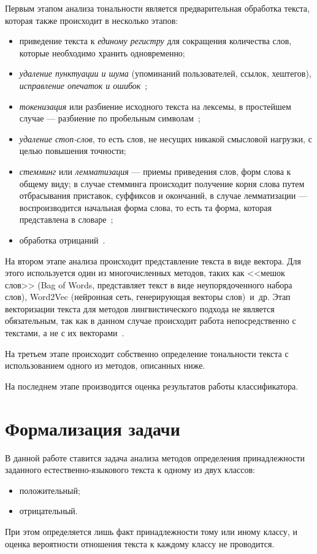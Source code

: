 Первым этапом анализа тональности является предварительная обработка текста,
которая также происходит в несколько этапов:
\begin{itemize}
    \item приведение текста к \textit{единому регистру} для сокращения
        количества слов, которые необходимо хранить одновременно;
    \item \textit{удаление пунктуации и шума} (упоминаний пользователей, ссылок,
        хештегов), \textit{исправление опечаток и ошибок}~\cite{article06};
    \item \textit{токенизация} или разбиение исходного текста на лексемы, в простейшем
        случае --- разбиение по пробельным символам~\cite{article07};
    \item \textit{удаление стоп-слов}, то есть слов, не несущих никакой смысловой
        нагрузки, с целью повышения точности;
    \item \textit{стемминг} или \textit{лемматизация} --- приемы приведения
        слов, форм слова к общему виду; в случае стемминга происходит получение
        корня слова путем отбрасывания приставок, суффиксов и окончаний, в
        случае лемматизации --- воспроизводится начальная форма слова, то есть
        та форма, которая представлена в словаре~\cite{article06};
    \item обработка отрицаний~\cite{article08}.
\end{itemize}

На втором этапе анализа происходит представление текста в виде вектора. Для
этого используется один из многочисленных методов, таких как <<мешок слов>> (Bag
of Words, представляет текст в виде неупорядоченного набора слов), Word2Vec
(нейронная сеть, генерирующая векторы слов)~и~др. Этап векторизации текста для
методов лингвистического подхода не является обязательным, так как в данном
случае происходит работа непосредственно с текстами, а не с их
векторами~\cite{article09}.

На третьем этапе происходит собственно определение тональности текста с
использованием одного из методов, описанных ниже.

На последнем этапе производится оценка результатов работы классификатора.

\section{Формализация задачи}

В данной работе ставится задача анализа методов определения принадлежности
заданного естественно-языкового текста к одному из двух классов:
\begin{itemize}
    \item положительный;
    \item отрицательный.
\end{itemize}

При этом определяется лишь факт принадлежности тому или иному классу, и оценка
вероятности отношения текста к каждому классу не проводится.

